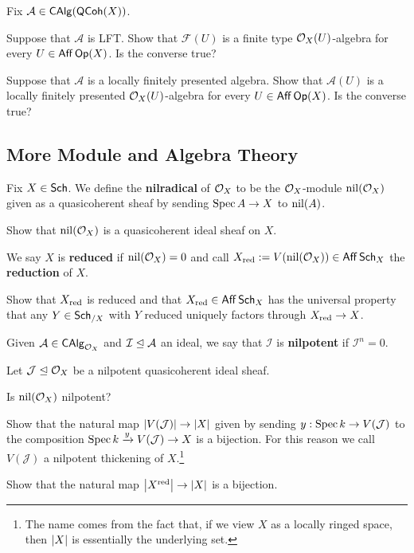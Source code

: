 \documentclass[11pt]{article}
\renewcommand{\AA}{\mathcal{A}}
\renewcommand{\F}{\mathcal{F}}
\newcommand{\I}{\mathcal{I}}
\newcommand{\J}{\mathcal{J}}
\begin{document}
\begin{exercise}
Fix $\AA\in\CAlg(\QCoh(X))$. 
\begin{enum}{\alph}
\item Suppose that $\AA$ is LFT. Show that $\F(U)$ is a finite type $\mathcal{O}_X(U)$-algebra for every $U\in\operatorname{\mathsf{Aff}}\operatorname{\mathsf{Op}}(X)$. Is the converse true? 

\item Suppose that $\AA$ is a locally finitely presented algebra. Show that $\AA(U)$ is a locally finitely presented $\mathcal{O}_X(U)$-algebra for every $U\in\operatorname{\mathsf{Aff}}\operatorname{\mathsf{Op}}(X)$. Is the converse true? 
\end{enum}
\end{exercise}

\subsection{More Module and Algebra Theory}
Fix $X\in\operatorname{\mathsf{Sch}}$. We define the \textbf{nilradical} of $\mathcal{O}_X$ to be the $\mathcal{O}_X$-module $\operatorname{nil}(\mathcal{O}_X)$ given as a quasicoherent sheaf by sending $\operatorname{Spec} A\to X$ to $\operatorname{nil}(A)$.

\begin{exercise}
Show that $\operatorname{nil}(\mathcal{O}_X)$ is a quasicoherent ideal sheaf on $X$.
\end{exercise}

We say $X$ is \textbf{reduced} if $\operatorname{nil}(\mathcal{O}_X)=0$ and call $X_{\operatorname{red}}:=V(\operatorname{nil}(\mathcal{O}_X))\in\operatorname{\mathsf{Aff}}\operatorname{\mathsf{Sch}}_X$ the \textbf{reduction} of $X$.

\begin{exercise}
Show that $X_{\operatorname{red}}$ is reduced and that $X_{\operatorname{red}}\in\operatorname{\mathsf{Aff}}\operatorname{\mathsf{Sch}}_X$ has the universal property that any $Y\in\operatorname{\mathsf{Sch}}_{/X}$ with $Y$ reduced uniquely factors through $X_{\operatorname{red}}\to X$.
\end{exercise}

Given $\AA\in\CAlg_{\O_X}$ and $\I\normal\AA$ an ideal, we say that $\I$ is \textbf{nilpotent} if $\I^n=0$. 

\begin{exercise}
Let $\J\normal\O_X$ be a nilpotent quasicoherent ideal sheaf.
\begin{enum}{\alph}
\item Is $\operatorname{nil}(\mathcal{O}_X)$ nilpotent?

\item Show that the natural map $\abs{V(\J)}\to\abs{X}$ given by sending $y:\Spec k\to V(\J)$ to the composition $\Spec k\xto{y}V(\J)\to X$ is a bijection. For this reason we call $V(\J)$ a nilpotent thickening of $X$.\footnote{The name comes from the fact that, if we view $X$ as a locally ringed space, then $\left\lvert X\right\rvert$ is essentially the underlying set.}

\item Show that the natural map $\left\lvert X^{\operatorname{red}}\right\rvert\to\left\lvert X\right\rvert$ is a bijection.
\end{enum}
\end{exercise}
\end{document}
